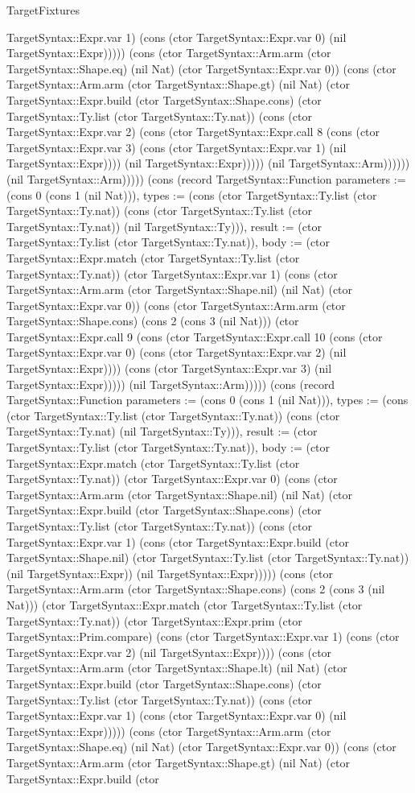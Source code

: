 \begin{lexlean}{TargetFixtures}
\begin{semanticmodule}
{TargetSyntax::Expr.var 1) (cons (ctor TargetSyntax::Expr.var 0) (nil TargetSyntax::Expr))))) (cons (ctor TargetSyntax::Arm.arm (ctor TargetSyntax::Shape.eq) (nil Nat) (ctor TargetSyntax::Expr.var 0)) (cons (ctor TargetSyntax::Arm.arm (ctor TargetSyntax::Shape.gt) (nil Nat) (ctor TargetSyntax::Expr.build (ctor TargetSyntax::Shape.cons) (ctor TargetSyntax::Ty.list (ctor TargetSyntax::Ty.nat)) (cons (ctor TargetSyntax::Expr.var 2) (cons (ctor TargetSyntax::Expr.call 8 (cons (ctor TargetSyntax::Expr.var 3) (cons (ctor TargetSyntax::Expr.var 1) (nil TargetSyntax::Expr)))) (nil TargetSyntax::Expr))))) (nil TargetSyntax::Arm)))))) (nil TargetSyntax::Arm))))}) (cons (record TargetSyntax::Function {parameters := (cons 0 (cons 1 (nil Nat))), types := (cons (ctor TargetSyntax::Ty.list (ctor TargetSyntax::Ty.nat)) (cons (ctor TargetSyntax::Ty.list (ctor TargetSyntax::Ty.nat)) (nil TargetSyntax::Ty))), result := (ctor TargetSyntax::Ty.list (ctor TargetSyntax::Ty.nat)), body := (ctor TargetSyntax::Expr.match (ctor TargetSyntax::Ty.list (ctor TargetSyntax::Ty.nat)) (ctor TargetSyntax::Expr.var 1) (cons (ctor TargetSyntax::Arm.arm (ctor TargetSyntax::Shape.nil) (nil Nat) (ctor TargetSyntax::Expr.var 0)) (cons (ctor TargetSyntax::Arm.arm (ctor TargetSyntax::Shape.cons) (cons 2 (cons 3 (nil Nat))) (ctor TargetSyntax::Expr.call 9 (cons (ctor TargetSyntax::Expr.call 10 (cons (ctor TargetSyntax::Expr.var 0) (cons (ctor TargetSyntax::Expr.var 2) (nil TargetSyntax::Expr)))) (cons (ctor TargetSyntax::Expr.var 3) (nil TargetSyntax::Expr))))) (nil TargetSyntax::Arm))))}) (cons (record TargetSyntax::Function {parameters := (cons 0 (cons 1 (nil Nat))), types := (cons (ctor TargetSyntax::Ty.list (ctor TargetSyntax::Ty.nat)) (cons (ctor TargetSyntax::Ty.nat) (nil TargetSyntax::Ty))), result := (ctor TargetSyntax::Ty.list (ctor TargetSyntax::Ty.nat)), body := (ctor TargetSyntax::Expr.match (ctor TargetSyntax::Ty.list (ctor TargetSyntax::Ty.nat)) (ctor TargetSyntax::Expr.var 0) (cons (ctor TargetSyntax::Arm.arm (ctor TargetSyntax::Shape.nil) (nil Nat) (ctor TargetSyntax::Expr.build (ctor TargetSyntax::Shape.cons) (ctor TargetSyntax::Ty.list (ctor TargetSyntax::Ty.nat)) (cons (ctor TargetSyntax::Expr.var 1) (cons (ctor TargetSyntax::Expr.build (ctor TargetSyntax::Shape.nil) (ctor TargetSyntax::Ty.list (ctor TargetSyntax::Ty.nat)) (nil TargetSyntax::Expr)) (nil TargetSyntax::Expr))))) (cons (ctor TargetSyntax::Arm.arm (ctor TargetSyntax::Shape.cons) (cons 2 (cons 3 (nil Nat))) (ctor TargetSyntax::Expr.match (ctor TargetSyntax::Ty.list (ctor TargetSyntax::Ty.nat)) (ctor TargetSyntax::Expr.prim (ctor TargetSyntax::Prim.compare) (cons (ctor TargetSyntax::Expr.var 1) (cons (ctor TargetSyntax::Expr.var 2) (nil TargetSyntax::Expr)))) (cons (ctor TargetSyntax::Arm.arm (ctor TargetSyntax::Shape.lt) (nil Nat) (ctor TargetSyntax::Expr.build (ctor TargetSyntax::Shape.cons) (ctor TargetSyntax::Ty.list (ctor TargetSyntax::Ty.nat)) (cons (ctor TargetSyntax::Expr.var 1) (cons (ctor TargetSyntax::Expr.var 0) (nil TargetSyntax::Expr))))) (cons (ctor TargetSyntax::Arm.arm (ctor TargetSyntax::Shape.eq) (nil Nat) (ctor TargetSyntax::Expr.var 0)) (cons (ctor TargetSyntax::Arm.arm (ctor TargetSyntax::Shape.gt) (nil Nat) (ctor TargetSyntax::Expr.build (ctor }
\end{semanticmodule}
\end{lexlean}
